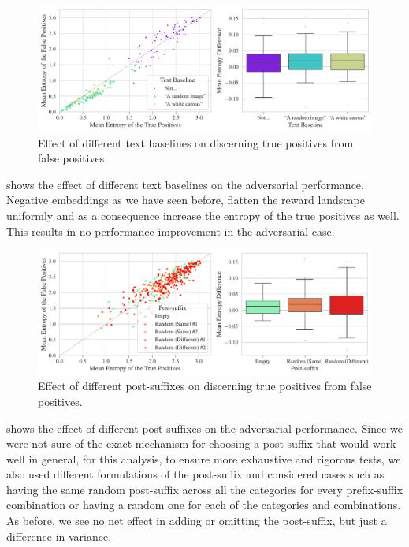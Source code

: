 \begin{figure}[H]
    \centering
    \includegraphics[width=\textwidth]{images/baseline_adversarial_2.pdf}
    \caption{Effect of different text baselines on discerning true positives from false positives.}
    \label{fig:baseline-adversarial}
\end{figure}

 shows the effect of different text baselines on the adversarial performance.
Negative embeddings as we have seen before, flatten the reward landscape uniformly and as a consequence increase the entropy of the true positives as well.
This results in no performance improvement in the adversarial case.

\begin{figure}[H]
    \centering
    \includegraphics[width=\textwidth]{images/post-suffix_adversarial_2.pdf}
    \caption{Effect of different post-suffixes on discerning true positives from false positives.}
    \label{fig:post-suffix-adversarial}
\end{figure}

 shows the effect of different post-suffixes on the adversarial performance.
Since we were not sure of the exact mechanism for choosing a post-suffix that would work well in general, for this analysis, to ensure more exhaustive and rigorous tests, we also used different formulations of the post-suffix and considered cases such as having the same random post-suffix across all the categories for every prefix-suffix combination or having a random one for each of the categories and combinations.
As before, we see no net effect in adding or omitting the post-suffix, but just a difference in variance.

